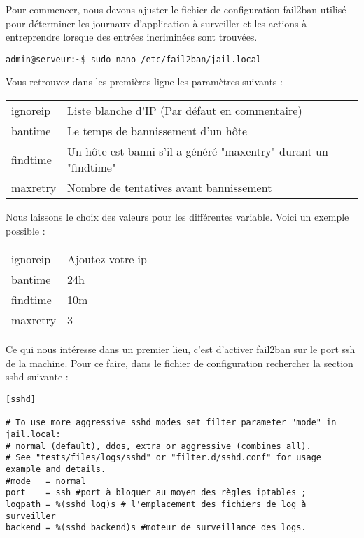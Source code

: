Pour commencer, nous devons ajuster le fichier de configuration fail2ban utilisé pour déterminer les journaux d'application à surveiller et les actions à entreprendre lorsque des entrées incriminées sont trouvées. 
 \begin{verbatim}
admin@serveur:~$ sudo nano /etc/fail2ban/jail.local
\end{verbatim}
Vous retrouvez dans les premières ligne les paramètres suivants : 
\begin{center}
\begin{tabular}{l|p{10cm}}
    ignoreip & Liste blanche d'IP (Par défaut en commentaire) \\
    bantime & Le temps de bannissement d'un hôte \\
    findtime & Un hôte est banni s'il a généré "maxentry" durant un "findtime"\\
    maxretry & Nombre de tentatives avant bannissement\\
\end{tabular}    
\end{center}
Nous laissons le choix des valeurs pour les différentes variable. Voici un exemple possible : 
\begin{center}
\begin{tabular}{l|p{10cm}}
    ignoreip & Ajoutez votre ip \\
    bantime & 24h\\
    findtime & 10m\\
    maxretry & 3\\
\end{tabular}    
\end{center}


Ce qui nous intéresse dans un premier lieu, c'est d'activer fail2ban sur le port ssh de la machine. Pour ce faire, dans le fichier de configuration rechercher la section sshd suivante :

 \begin{verbatim}
[sshd]

# To use more aggressive sshd modes set filter parameter "mode" in jail.local:
# normal (default), ddos, extra or aggressive (combines all).
# See "tests/files/logs/sshd" or "filter.d/sshd.conf" for usage example and details.
#mode   = normal
port    = ssh #port à bloquer au moyen des règles iptables ;
logpath = %(sshd_log)s # l'emplacement des fichiers de log à surveiller
backend = %(sshd_backend)s #moteur de surveillance des logs.
\end{verbatim}

